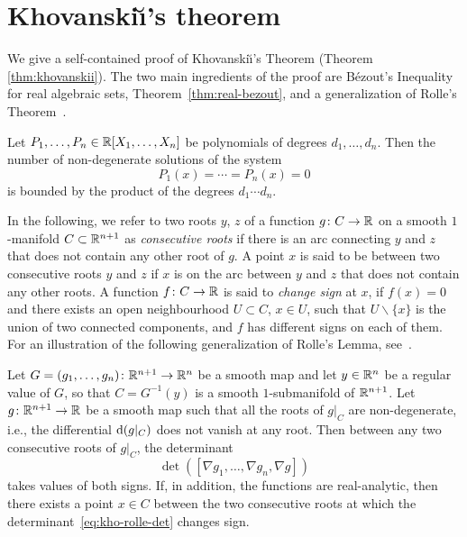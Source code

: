 \section{Khovanski{\u\i}'s theorem}
We give a self-contained proof of Khovanski{\u\i}'s Theorem (Theorem \ref{thm:khovanskii}).
The two main ingredients of the proof are B\'ezout's Inequality for real algebraic sets, Theorem~\ref{thm:real-bezout}, and a generalization of Rolle's Theorem~\cite[\S 3.2]{khovanskiui1991fewnomials}.

\begin{theorem} \label{thm:real-bezout}
  Let $P_1, \dots, P_n \in \mathbb{R}[X_1, \dots, X_n]$ be polynomials of degrees $d_1, \dots, d_n$. Then the number of non-degenerate solutions of the system
  \begin{equation*}
  P_1(x) = \cdots = P_n(x) = 0
  \end{equation*}
  is bounded by the product of the degrees $d_1 \cdots d_n$.
  \end{theorem}

In the following, we refer to two roots $y$, $z$ of a function $g\colon C\to \mathbb{R}$ on a smooth $1$-manifold $C\subset \mathbb{R}^{n+1}$ as {\em consecutive roots} if there is an arc connecting $y$ and $z$ that does not contain any other root of $g$. A point $x$ is said to be between two consecutive roots $y$ and $z$ if $x$ is on the arc between $y$ and $z$ that does not contain any other roots. A function $f\colon C\to \mathbb{R}$ is said to \emph{change sign} at $x$, if $f(x)=0$ and there exists an open neighbourhood $U\subset C$, $x\in U$, such that $U\backslash \{x\}$ is the union of two connected components, and $f$ has different signs on each of them. 
For an illustration of the following generalization of Rolle's Lemma, see~\cite{bates2011khovanskii}.

\begin{lemma} \label{lem:kho-rolle}
Let $G = (g_1, \ldots, g_n)\colon \mathbb{R}^{n+1} \rightarrow \mathbb{R}^n$ be a smooth map and let $y \in \mathbb{R}^n$ be a regular value of $G$, so that $C = G^{-1}(y)$ is a smooth $1$-submanifold of $\mathbb{R}^{n+1}$. Let $g\colon \mathbb{R}^{n+1} \rightarrow \mathbb{R}$ be a smooth map such that all the roots of $g|_C$ are non-degenerate, i.e., the differential $\mathrm{d}{(}g|_C)$ does not vanish at any root. Then between any two consecutive roots of $g|_C$, the determinant
\begin{equation}\label{eq:kho-rolle-det}
 \det([\nabla g_1, \ldots, \nabla g_n, \nabla g])
\end{equation}
takes values of both signs. If, in addition, the functions are real-analytic, then there exists a point $x\in C$ between the two consecutive roots at which the determinant~\eqref{eq:kho-rolle-det} changes sign.
\end{lemma}

